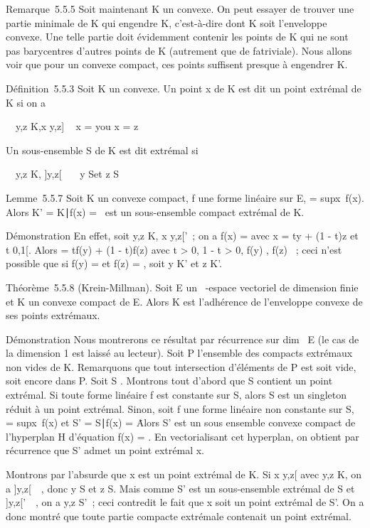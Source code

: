 Remarque~5.5.5 Soit maintenant K un convexe. On peut essayer de trouver
une partie minimale de K qui engendre K, c'est-à-dire dont K soit
l'enveloppe convexe. Une telle partie doit évidemment contenir les
points de K qui ne sont pas barycentres d'autres points de K (autrement
que de fa\ccon triviale). Nous allons voir que pour
un convexe compact, ces points suffisent presque à engendrer K.

Définition~5.5.3 Soit K un convexe. Un point x de K est dit un point
extrémal de K si on a

\forall~~y,z \in K,\quad x \in {[}y,z{]} \rigtharrow~
x = y\text ou x = z

Un sous-ensemble S de K est dit extrémal si

\forall~~y,z \in K,\quad
{]}y,z{[}\bigcapS\neq~\varnothing~\rigtharrow~ y \in S\text et
z \in S

Lemme~5.5.7 Soit K un convexe compact, f une forme linéaire sur E, \mu
= supx\inK~f(x). Alors K' =
\x \in K∣f(x) =
\mu\ est un sous-ensemble compact extrémal de K.

Démonstration En effet, soit y,z \in K, x \in{]}y,z{[}\bigcapK'~; on a f(x) = \mu
avec x = ty + (1 - t)z et t \in{]}0,1{[}. Alors \mu = tf(y) + (1 - t)f(z)
avec t \textgreater{} 0, 1 - t \textgreater{} 0, f(y) \leq \mu, f(z) \leq \mu~;
ceci n'est possible que si f(y) = \mu et f(z) = \mu, soit y \in K' et z \in K'.

Théorème~5.5.8 (Krein-Millman). Soit E un ~-espace vectoriel de
dimension finie et K un convexe compact de E. Alors K est l'adhérence de
l'enveloppe convexe de ses points extrémaux.

Démonstration Nous montrerons ce résultat par récurrence sur
dim~ E (le cas de la dimension 1 est laissé au
lecteur). Soit P l'ensemble des compacts extrémaux non vides de K.
Remarquons que tout intersection d'éléments de P est soit vide, soit
encore dans P. Soit S \inP. Montrons tout d'abord que S contient un point
extrémal. Si toute forme linéaire f est constante sur S, alors S est un
singleton réduit à un point extrémal. Sinon, soit f une forme linéaire
non constante sur S, \mu = supx\inS~f(x)
et S' = \x \in S∣f(x) =
\mu\. Alors S' est un sous ensemble convexe compact de
l'hyperplan H d'équation f(x) = \mu. En vectorialisant cet hyperplan, on
obtient par récurrence que S' admet un point extrémal x.

Montrons par l'absurde que x est un point extrémal de K. Si x \in{]}y,z{[}
avec y,z \in K, on a {]}y,z{[}\bigcapS\neq~\varnothing~, donc y \in S
et z \in S. Mais comme S' est un sous-ensemble extrémal de S et
{]}y,z{[}\bigcapS'\neq~\varnothing~, on a y,z \in S'~; ceci
contredit le fait que x soit un point extrémal de S'. On a donc montré
que toute partie compacte extrémale contenait un point extrémal.

